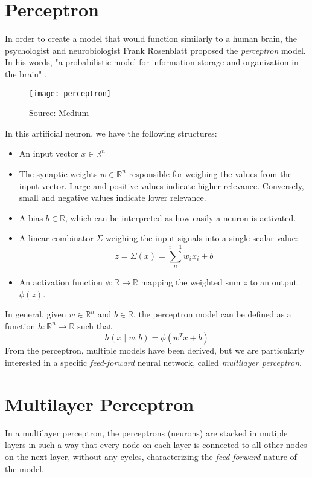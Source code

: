 \section{Perceptron}
In order to create a model that would function similarly to a human brain, the psychologist and neurobiologist Frank Rosenblatt proposed the \textit{perceptron} model. In his words, "a probabilistic model for information storage and organization in the brain" \cite{rosenblatt:perceptron}.
\begin{figure}[H]
    \texttt{[image: perceptron]}
    \caption{Source: \href{https://medium.com/@stanleydukor/neural-representation-of-and-or-not-xor-and-xnor-logic-gates-perceptron-algorithm-b0275375fea1}{Medium}}
\end{figure}
In this artificial neuron, we have the following structures:
\begin{itemize}
    \item An input vector $x \in \mathbb{R}^n$
    \item The synaptic weights $w \in \mathbb{R}^n$ responsible for weighing the values from the input vector. Large and positive values indicate higher relevance. Conversely, small and negative values indicate lower relevance.
    \item A bias $b \in \mathbb{R}$, which can be interpreted as how easily a neuron is activated.
    \item A linear combinator $\Sigma$ weighing the input signals into a single scalar value:
    \[
        z = \Sigma(x) = \sum^{i=1}_{n}w_i x_i + b   
    \]
    \item An activation function $\phi \colon \mathbb{R} \to \mathbb{R}$ mapping the weighted sum $z$ to an output $\phi(z)$.
\end{itemize}
In general, given $w \in \mathbb{R}^n$ and $b \in \mathbb{R}$, the perceptron model can be defined as a function $h \colon \mathbb{R}^n \to \mathbb{R}$ such that
\[
    h(x \mid w, b) = \phi(w^Tx + b)    
\]
From the perceptron, multiple models have been derived, but we are particularly interested in a specific \textit{feed-forward} neural network, called \textit{multilayer perceptron}.

\section{Multilayer Perceptron}
In a multilayer perceptron, the perceptrons (neurons) are stacked in mutiple layers in such a way that every node on each layer is connected to all other nodes on the next layer, without any cycles, characterizing the \textit{feed-forward} nature of the model.

